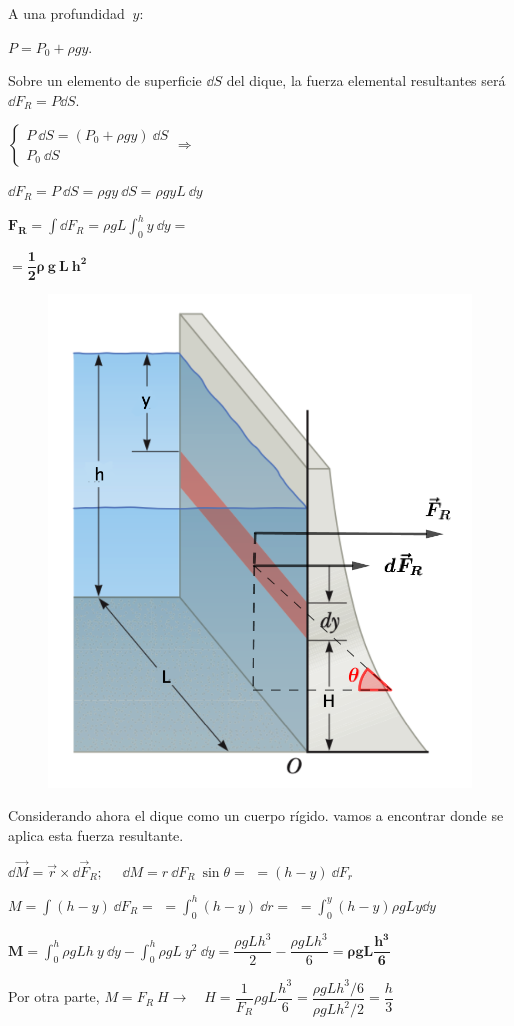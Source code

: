 \begin{multicols}{2}
A una profundidad $\ y:$ 

$P=P_0+\rho g y.\ $  

Sobre un elemento de superficie $\dd S$ del dique, la fuerza elemental resultantes será  $\dd F_R=P\dd S$.

$\begin{cases} P \ \dd S=(P_0+\rho g y)\ \dd S \\ P_0 \ \dd S \end{cases} \Rightarrow$ 

$\dd F_R= P \ \dd S=\rho g y \ \dd S =\rho g y L \ \dd y$

$\displaystyle \boldsymbol{F_R}=\int \dd F_R =\rho g L \int_0^h y \ \dd y= $ 

$=\boldsymbol{\dfrac 1 2 \rho \ g \ L \ h^2}$


\begin{figure}[H]
	\centering
	\includegraphics[width=.4\textwidth]{imagenes/imagenes07/T07IM13.png}
\end{figure}
\end{multicols}

Considerando ahora el dique como un cuerpo rígido. vamos a encontrar donde se aplica esta fuerza resultante.



$\dd \overrightarrow{M}=\vec r \times \dd \vec F_R;\quad$
$\dd M=r\  \dd F_R\  \sin \theta=$
$=(h-y) \ \dd F_r$

$M=\int (h-y)\ \dd F_R=$
$=\displaystyle \int_0^h (h-y)\ \dd r=$
$\displaystyle =\int_0^y (h-y) \rho g L y \dd y$

$\boldsymbol{M=}\displaystyle \int_0^h \rho g L h \ y \ \dd y -\int_0^h \rho g L \ y^2 \ \dd y=\dfrac{\rho g L h^3}2-\dfrac{\rho g L h^3}6 \boldsymbol{=\rho g L \dfrac {h^3}6}$

Por otra parte, $M=F_R\ H \to \quad H=\dfrac 1{F_R} \rho g L \dfrac{h^3}6=\dfrac{\rho g L h^3 / 6}{\rho g L h^2/2}=\dfrac h 3$

